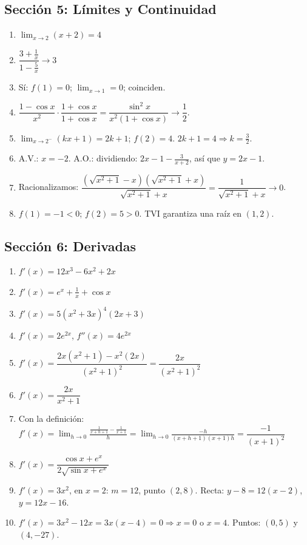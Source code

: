 \documentclass[12pt, letterpaper]{article}
\begin{document}
\subsection*{Sección 5: Límites y Continuidad}

\begin{enumerate}[resume=soluciones, leftmargin=*, label=\textbf{\arabic*.}]
  \item $\lim_{x \to 2} (x + 2) = 4$
  \item $\dfrac{3 + \frac{1}{x}}{1 - \frac{5}{x}} \to 3$
  \item Sí: $f(1) = 0$; $\lim_{x \to 1} = 0$; coinciden.
  \item $\dfrac{1 - \cos x}{x^2} \cdot \dfrac{1 + \cos x}{1 + \cos x} = \dfrac{\sin^2 x}{x^2(1 + \cos x)} \to \dfrac{1}{2}$.
  \item $\lim_{x \to 2^-} (kx + 1) = 2k + 1$; $f(2) = 4$. $2k + 1 = 4 \Rightarrow k = \frac{3}{2}$.
  \item A.V.: $x = -2$. A.O.: dividiendo: $2x - 1 - \frac{3}{x + 2}$, así que $y = 2x - 1$.
  \item Racionalizamos: $\dfrac{(\sqrt{x^2+1} - x)(\sqrt{x^2+1} + x)}{\sqrt{x^2+1} + x} = \dfrac{1}{\sqrt{x^2+1} + x} \to 0$.
  \item $f(1) = -1 < 0$; $f(2) = 5 > 0$. TVI garantiza una raíz en $(1, 2)$.
\end{enumerate}

\subsection*{Sección 6: Derivadas}

\begin{enumerate}[resume=soluciones, leftmargin=*, label=\textbf{\arabic*.}]
  \item $f'(x) = 12x^3 - 6x^2 + 2x$
  \item $f'(x) = e^x + \frac{1}{x} + \cos x$
  \item $f'(x) = 5(x^2 + 3x)^4(2x + 3)$
  \item $f'(x) = 2e^{2x}$, $f''(x) = 4e^{2x}$
  \item $f'(x) = \dfrac{2x(x^2 + 1) - x^2(2x)}{(x^2 + 1)^2} = \dfrac{2x}{(x^2 + 1)^2}$
  \item $f'(x) = \dfrac{2x}{x^2 + 1}$
  \item Con la definición: $f'(x) = \lim_{h \to 0} \frac{\frac{1}{x+h+1} - \frac{1}{x+1}}{h} = \lim_{h \to 0} \frac{-h}{(x+h+1)(x+1)h} = \dfrac{-1}{(x+1)^2}$
  \item $f'(x) = \dfrac{\cos x + e^x}{2\sqrt{\sin x + e^x}}$
  \item $f'(x) = 3x^2$, en $x = 2$: $m = 12$, punto $(2, 8)$. Recta: $y - 8 = 12(x - 2)$, $y = 12x - 16$.
  \item $f'(x) = 3x^2 - 12x = 3x(x - 4) = 0 \Rightarrow x = 0$ o $x = 4$. Puntos: $(0, 5)$ y $(4, -27)$.
\end{enumerate}
\end{document}
